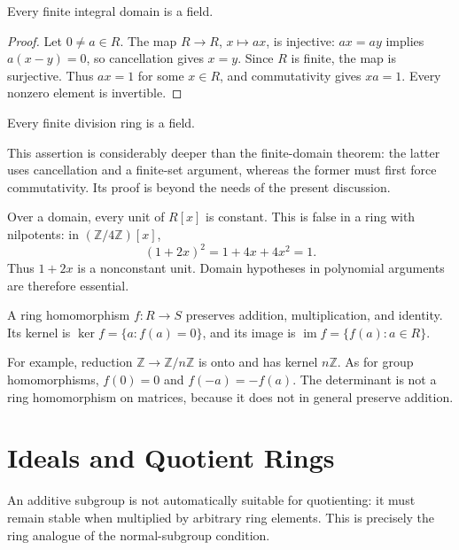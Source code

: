 \begin{theorem}
Every finite integral domain is a field.
\end{theorem}
\begin{proof}
Let \(0\ne a\in R\).  The map \(R\to R\), \(x\mapsto ax\), is injective:
\(ax=ay\) implies \(a(x-y)=0\), so cancellation gives \(x=y\).  Since
\(R\) is finite, the map is surjective.  Thus \(ax=1\) for some \(x\in R\),
and commutativity gives \(xa=1\).  Every nonzero element is invertible.
\end{proof}
\begin{applicationtheorem}
Every finite division ring is a field.
\end{applicationtheorem}
\begin{remark}
This assertion is considerably deeper than the finite-domain theorem: the
latter uses cancellation and a finite-set argument, whereas the former must
first force commutativity.  Its proof is beyond the needs of the present
discussion.
\end{remark}

\begin{example}
Over a domain, every unit of \(R[x]\) is constant. This is false in a ring
with nilpotents: in \((\mathbb Z/4\mathbb Z)[x]\),
\[(1+2x)^2=1+4x+4x^2=1.\]
Thus \(1+2x\) is a nonconstant unit. Domain hypotheses in polynomial
arguments are therefore essential.
\end{example}

\begin{definition}
A ring homomorphism \(f:R\to S\) preserves addition, multiplication, and
identity. Its kernel is \(\ker f=\{a:f(a)=0\}\), and its image is
\(\operatorname{im}f=\{f(a):a\in R\}\).
\end{definition}
For example, reduction \(\mathbb Z\to\mathbb Z/n\mathbb Z\) is onto and has
kernel \(n\mathbb Z\). As for group homomorphisms, \(f(0)=0\) and
\(f(-a)=-f(a)\). The determinant is not a ring homomorphism on matrices,
because it does not in general preserve addition.

\section{Ideals and Quotient Rings}
An additive subgroup is not automatically suitable for quotienting: it must
remain stable when multiplied by arbitrary ring elements. This is precisely
the ring analogue of the normal-subgroup condition.

